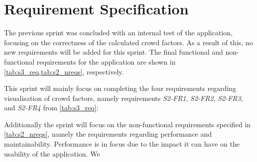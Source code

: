 \section{Requirement Specification} \label{sec:s4_reqs}
The previous sprint was concluded with an internal test of the application, focusing on the correctness of the calculated crowd factors. As a result of this, no new requirements will be added for this sprint. The final functional and non-functional requirements for the application are shown in \cref{tab:s3_req,tab:s2_nreqs}, respectively.

This sprint will mainly focus on completing the four requirements regarding visualisation of crowd factors, namely requirements \emph{S2-FR1}, \emph{S2-FR2}, \emph{S2-FR3}, and \emph{S2-FR4} from \cref{tab:s3_req}:

Additionally the sprint will focus on the non-functional requirements specified in \cref{tab:s2_nreqs}, namely the requirements regarding performance and maintainability. Performance is in focus due to the impact it can have on the usability of the application. We  